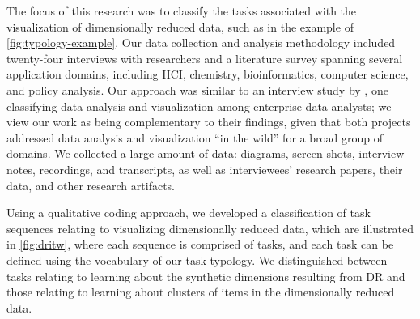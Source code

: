 The focus of this research was to classify the tasks associated with the visualization of dimensionally reduced data, such as in the example of \autoref{fig:typology-example}.
Our data collection and analysis methodology included twenty-four interviews with researchers and a literature survey spanning several application domains, including \ac{HCI}, chemistry, bioinformatics, computer science, and policy analysis.
Our approach was similar to an interview study by \citet{Kandel2012}, one classifying data analysis and visualization among enterprise data analysts; we view our work as being complementary to their findings, given that both projects addressed data analysis and visualization ``in the wild'' for a broad group of domains.
We collected a large amount of data: diagrams, screen shots, interview notes, recordings, and transcripts, as well as interviewees' research papers, their data, and other research artifacts.

Using a qualitative coding approach, we developed a classification of task sequences relating to visualizing dimensionally reduced data, which are illustrated in \autoref{fig:dritw}, where each sequence is comprised of tasks, and each task can be defined using the vocabulary of our task typology.
We distinguished between tasks relating to learning about the synthetic dimensions resulting from \ac{DR} and those relating to learning about clusters of items in the dimensionally reduced data.


